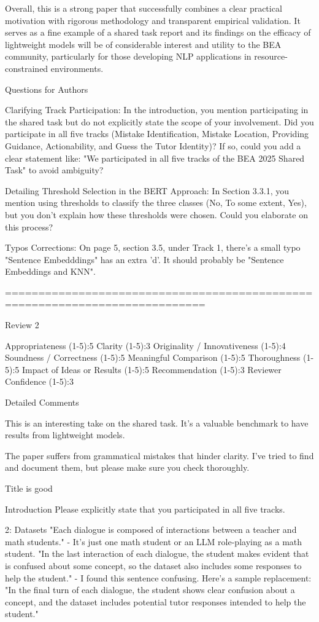Overall, this is a strong paper that successfully combines a clear practical motivation with rigorous methodology and transparent empirical validation. It serves as a fine example of a shared task report and its findings on the efficacy of lightweight models will be of considerable interest and utility to the BEA community, particularly for those developing NLP applications in resource-constrained environments.

Questions for Authors

Clarifying Track Participation: In the introduction, you mention participating in the shared task but do not explicitly state the scope of your involvement. Did you participate in all five tracks (Mistake Identification, Mistake Location, Providing Guidance, Actionability, and Guess the Tutor Identity)? If so, could you add a clear statement like: "We participated in all five tracks of the BEA 2025 Shared Task" to avoid ambiguity?

Detailing Threshold Selection in the BERT Approach: In Section 3.3.1, you mention using thresholds to classify the three classes (No, To some extent, Yes), but you don't explain how these thresholds were chosen. Could you elaborate on this process?

Typos Corrections: On page 5, section 3.5, under Track 1, there's a small typo "Sentence Embedddings" has an extra 'd'. It should probably be "Sentence Embeddings and KNN".

============================================================================


Review 2

Appropriateness (1-5):5
Clarity (1-5):3
Originality / Innovativeness (1-5):4
Soundness / Correctness (1-5):5
Meaningful Comparison (1-5):5
Thoroughness (1-5):5
Impact of Ideas or Results (1-5):5
Recommendation (1-5):3
Reviewer Confidence (1-5):3

Detailed Comments

This is an interesting take on the shared task. It's a valuable benchmark to have results from lightweight models. 

The paper suffers from grammatical mistakes that hinder clarity. I've tried to find and document them, but please make sure you check thoroughly.

Title is good

Introduction Please explicitly state that you participated in all five tracks.

2: Datasets "Each dialogue is composed of interactions between a teacher and math students." - It's just one math student or an LLM role-playing as a math student. "In the last interaction of each dialogue, the student makes evident that is confused about some concept, so the dataset also includes some responses to help the student." - I found this sentence confusing. Here's a sample replacement: "In the final turn of each dialogue, the student shows clear confusion about a concept, and the dataset includes potential tutor responses intended to help the student."

